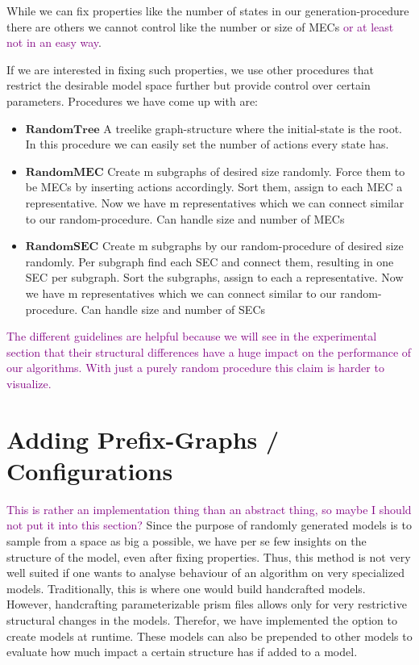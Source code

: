 While we can fix properties like the number of states in our generation-procedure there are others we cannot control like the number or size of MECs \textcolor{purple}{or at least not in an easy way}.

If we are interested in fixing such properties, we use other procedures that restrict the desirable model space further but provide control over certain parameters. Procedures we have come up with are:
\begin{itemize}
\item $\textbf{RandomTree}$ A treelike graph-structure where the initial-state is the root. In this procedure we can easily set the number of actions every state has.
\item $\textbf{RandomMEC}$ Create m subgraphs of desired size randomly. Force them to be MECs by inserting actions accordingly. Sort them, assign to each MEC a representative. Now we have m representatives which we can connect similar to our random-procedure. Can handle size and number of MECs
\item $\textbf{RandomSEC}$ Create m subgraphs by our random-procedure of desired size randomly. Per subgraph find each SEC and connect them, resulting in one SEC per subgraph. Sort the subgraphs, assign to each a representative. Now we have m representatives which we can connect similar to our random-procedure. Can handle size and number of SECs
\end{itemize}

\textcolor{purple}{The different guidelines are helpful because we will see in the experimental section that their structural differences have a huge impact on the performance of our algorithms. With just a purely random procedure this claim is harder to visualize.}

\section{Adding Prefix-Graphs / Configurations}
\textcolor{purple}{This is rather an implementation thing than an abstract thing, so maybe I should not put it into this section?}
Since the purpose of randomly generated models is to sample from a space as big a possible, we have per se few insights on the structure of the model, even after fixing properties. Thus, this method is not very well suited if one wants to analyse behaviour of an algorithm on very specialized models. Traditionally, this is where one would build handcrafted models. However, handcrafting parameterizable prism files allows only for very restrictive structural changes in the models. Therefor, we have implemented the option to create models at runtime. These models can also be prepended to other models to evaluate how much impact a certain structure has if added to a model.

